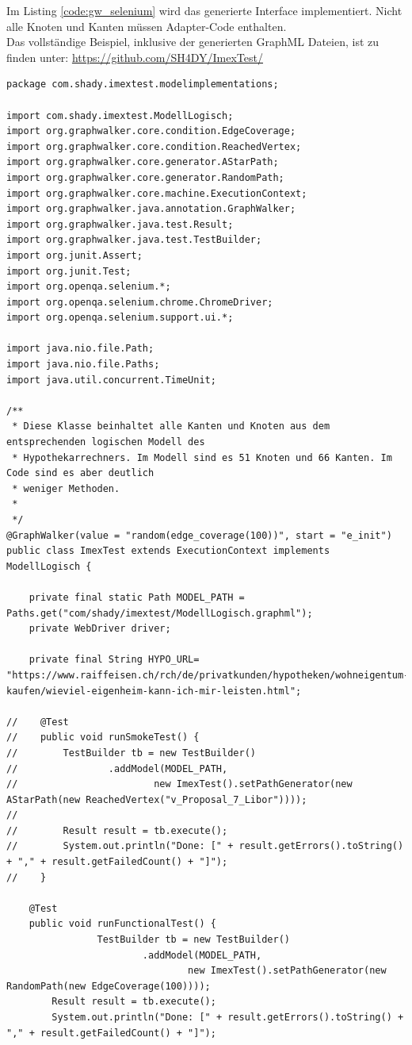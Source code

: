 Im Listing \ref{code:gw_selenium} wird das generierte Interface implementiert. Nicht alle Knoten und Kanten müssen Adapter-Code enthalten.\\

Das vollständige Beispiel, inklusive der generierten GraphML Dateien, ist zu finden unter: \url{https://github.com/SH4DY/ImexTest/}

\begin{lstlisting}[caption=ImexTest.java, label=code:gw_selenium]
package com.shady.imextest.modelimplementations;

import com.shady.imextest.ModellLogisch;
import org.graphwalker.core.condition.EdgeCoverage;
import org.graphwalker.core.condition.ReachedVertex;
import org.graphwalker.core.generator.AStarPath;
import org.graphwalker.core.generator.RandomPath;
import org.graphwalker.core.machine.ExecutionContext;
import org.graphwalker.java.annotation.GraphWalker;
import org.graphwalker.java.test.Result;
import org.graphwalker.java.test.TestBuilder;
import org.junit.Assert;
import org.junit.Test;
import org.openqa.selenium.*;
import org.openqa.selenium.chrome.ChromeDriver;
import org.openqa.selenium.support.ui.*;

import java.nio.file.Path;
import java.nio.file.Paths;
import java.util.concurrent.TimeUnit;

/**
 * Diese Klasse beinhaltet alle Kanten und Knoten aus dem entsprechenden logischen Modell des
 * Hypothekarrechners. Im Modell sind es 51 Knoten und 66 Kanten. Im Code sind es aber deutlich
 * weniger Methoden.
 *
 */
@GraphWalker(value = "random(edge_coverage(100))", start = "e_init")
public class ImexTest extends ExecutionContext implements ModellLogisch {

    private final static Path MODEL_PATH = Paths.get("com/shady/imextest/ModellLogisch.graphml");
    private WebDriver driver;

    private final String HYPO_URL= "https://www.raiffeisen.ch/rch/de/privatkunden/hypotheken/wohneigentum-kaufen/wieviel-eigenheim-kann-ich-mir-leisten.html";

//    @Test
//    public void runSmokeTest() {
//        TestBuilder tb = new TestBuilder()
//                .addModel(MODEL_PATH,
//                        new ImexTest().setPathGenerator(new AStarPath(new ReachedVertex("v_Proposal_7_Libor"))));
//
//        Result result = tb.execute();
//        System.out.println("Done: [" + result.getErrors().toString() + "," + result.getFailedCount() + "]");
//    }

    @Test
    public void runFunctionalTest() {
                TestBuilder tb = new TestBuilder()
                        .addModel(MODEL_PATH,
                                new ImexTest().setPathGenerator(new RandomPath(new EdgeCoverage(100))));
        Result result = tb.execute();
        System.out.println("Done: [" + result.getErrors().toString() + "," + result.getFailedCount() + "]");


\end{lstlisting}
